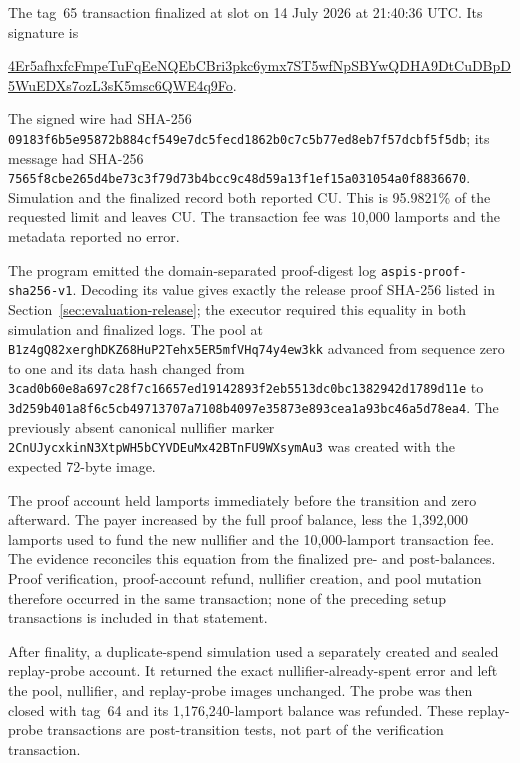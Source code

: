 The tag~65 transaction finalized at slot \ProfileMainnetSlot{} on 14 July
2026 at 21:40:36 UTC.  Its signature is
\begin{center}
  \scriptsize\ttfamily
  \href{https://explorer.solana.com/tx/4Er5afhxfcFmpeTuFqEeNQEbCBri3pkc6ymx7ST5wfNpSBYwQDHA9DtCuDBpD5WuEDXs7ozL3sK5msc6QWE4q9Fo?cluster=mainnet-beta}{4Er5afhxfcFmpeTuFqEeNQEbCBri3pkc6ymx7ST5wfNpSBYwQDHA9DtCuDBpD5WuEDXs7ozL3sK5msc6QWE4q9Fo}.
\end{center}
The signed wire had SHA-256
\nolinkurl{09183f6b5e95872b884cf549e7dc5fecd1862b0c7c5b77ed8eb7f57dcbf5f5db};
its message had SHA-256
\nolinkurl{7565f8cbe265d4be73c3f79d73b4bcc9c48d59a13f1ef15a031054a0f8836670}.
Simulation and the finalized record both reported
\ProfileMainnetComputeUnits{} CU.  This is 95.9821\% of the requested limit
and leaves \ProfileMainnetComputeHeadroom{} CU.  The transaction fee was
10,000 lamports and the metadata reported no error.

The program emitted the domain-separated proof-digest log
\texttt{aspis-proof-sha256-v1}.  Decoding its value gives exactly the release
proof SHA-256 listed in Section~\ref{sec:evaluation-release}; the executor
required this equality in both simulation and finalized logs.  The pool at
\nolinkurl{B1z4gQ82xerghDKZ68HuP2Tehx5ER5mfVHq74y4ew3kk} advanced from sequence
zero to one and its data hash changed from
\nolinkurl{3cad0b60e8a697c28f7c16657ed19142893f2eb5513dc0bc1382942d1789d11e}
to
\nolinkurl{3d259b401a8f6c5cb49713707a7108b4097e35873e893cea1a93bc46a5d78ea4}.
The previously absent canonical nullifier marker
\nolinkurl{2CnUJycxkinN3XtpWH5bCYVDEuMx42BTnFU9WXsymAu3} was created with the
expected 72-byte image.

The proof account held \ProfileProofRentLamports{} lamports immediately before
the transition and zero afterward.  The payer increased by the full proof
balance, less the 1,392,000 lamports used to fund the new nullifier and the
10,000-lamport transaction fee.  The evidence reconciles this equation from
the finalized pre- and post-balances.  Proof verification, proof-account
refund, nullifier creation, and pool mutation therefore occurred in the same
transaction; none of the preceding setup transactions is included in that
statement.

After finality, a duplicate-spend simulation used a separately created and
sealed replay-probe account.  It returned the exact nullifier-already-spent
error and left the pool, nullifier, and replay-probe images unchanged.  The
probe was then closed with tag~64 and its 1,176,240-lamport balance was
refunded.  These replay-probe transactions are post-transition tests, not part
of the verification transaction.

